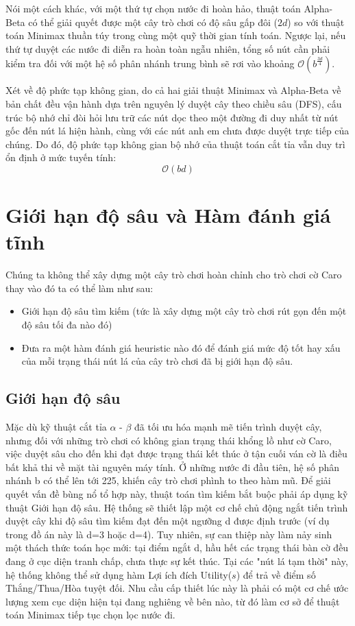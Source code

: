 Nói một cách khác, với một thứ tự chọn nước đi hoàn hảo, thuật toán Alpha-Beta có thể giải quyết được một cây trò chơi có độ sâu gấp đôi ($2d$) so với thuật toán Minimax thuần túy trong cùng một quỹ thời gian tính toán. Ngược lại, nếu thứ tự duyệt các nước đi diễn ra hoàn toàn ngẫu nhiên, tổng số nút cần phải kiểm tra đối với một hệ số phân nhánh trung bình sẽ rơi vào khoảng $\mathcal{O}\left(b^{\frac{3d}{4}}\right)$.

Xét về độ phức tạp không gian, do cả hai giải thuật Minimax và Alpha-Beta về bản chất đều vận hành dựa trên nguyên lý duyệt cây theo chiều sâu (DFS), cấu trúc bộ nhớ chỉ đòi hỏi lưu trữ các nút dọc theo một đường đi duy nhất từ nút gốc đến nút lá hiện hành, cùng với các nút anh em chưa được duyệt trực tiếp của chúng. Do đó, độ phức tạp không gian bộ nhớ của thuật toán cắt tỉa vẫn duy trì ổn định ở mức tuyến tính:
$$\mathcal{O}(bd)$$

\section{Giới hạn độ sâu và Hàm đánh giá tĩnh}

Chúng ta không thể xây dựng một cây trò chơi hoàn chỉnh cho trò chơi cờ Caro thay vào đó ta có thể làm như sau:

\begin{itemize}
	\item Giới hạn độ sâu tìm kiếm (tức là xây dựng một cây trò chơi rút gọn đến một độ sâu tối đa nào đó)
	\item Đưa ra một hàm đánh giá heuristic nào đó để đánh giá mức độ tốt hay xấu của mỗi trạng thái nút lá của cây trò chơi đã bị giới hạn độ sâu. 
\end{itemize}

\subsection{Giới hạn độ sâu}

Mặc dù kỹ thuật cắt tỉa $\alpha$ - $\beta$ đã tối ưu hóa mạnh mẽ tiến trình duyệt cây, nhưng đối với những trò chơi có không gian trạng thái khổng lồ như cờ Caro, việc duyệt sâu cho đến khi đạt được trạng thái kết thúc ở tận cuối ván cờ là điều bất khả thi về mặt tài nguyên máy tính. Ở những nước đi đầu tiên, hệ số phân nhánh b có thể lên tới 225, khiến cây trò chơi phình to theo hàm mũ.
Để giải quyết vấn đề bùng nổ tổ hợp này, thuật toán tìm kiếm bắt buộc phải áp dụng kỹ thuật Giới hạn độ sâu. Hệ thống sẽ thiết lập một cơ chế chủ động ngắt tiến trình duyệt cây khi độ sâu tìm kiếm đạt đến một ngưỡng d được định trước (ví dụ trong đồ án này là d=3 hoặc d=4). Tuy nhiên, sự can thiệp này làm nảy sinh một thách thức toán học mới: tại điểm ngắt d, hầu hết các trạng thái bàn cờ đều đang ở cục diện tranh chấp, chưa thực sự kết thúc. Tại các "nút lá tạm thời" này, hệ thống không thể sử dụng hàm Lợi ích đích Utility($s$) để trả về điểm số Thắng/Thua/Hòa tuyệt đối. Nhu cầu cấp thiết lúc này là phải có một cơ chế ước lượng xem cục diện hiện tại đang nghiêng về bên nào, từ đó làm cơ sở để thuật toán Minimax tiếp tục chọn lọc nước đi. 

